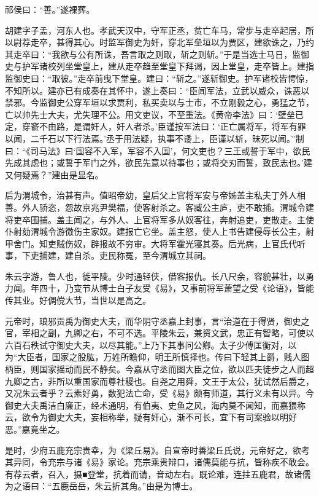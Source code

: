 \documentclass[]{article}
\begin{document}
祁侯曰：``善。''遂裸葬。

胡建字子孟，河东人也。孝武天汉中，守军正丞，贫亡车马，常步与走卒起居，所以尉荐走卒，甚得其心。时监军御史为奸，穿北军垒垣以为贾区，建欲诛之，乃约其走卒曰：``我欲与公有所诛，吾言取之则取，斩之则斩。''于是当选士马日，监御史与护军诸校列坐堂皇上，建从走卒趋至堂皇下拜谒，因上堂皇，走卒皆上。建指监御史曰：``取彼。''走卒前曳下堂皇。建曰：``斩之。''遂斩御史。护军诸校皆愕惊，不知所以。建亦已有成奏在其怀中，遂上奏曰：``臣闻军法，立武以威众，诛恶以禁邪。今监御史公穿军垣以求贾利，私买卖以与士市，不立刚毅之心，勇猛之节，亡以帅先士大夫，尤失理不公。用文吏议，不至重法。《黄帝李法》曰：`壁垒已定，穿窬不由路，是谓奸人，奸人者杀。'臣谨按军法曰：`正亡属将军，将军有罪以闻，二千石以下行法焉。'丞于用法疑，执事不诿上，臣谨以斩，昧死以闻。''制曰：``《司马法》曰`国容不入军，军容不入国'，何文吏也？三王或誓于军中，欲民先成其虑也；或誓于军门之外，欲民先意以待事也；或将交刃而誓，致民志也。'建又何疑焉？''建由是显名。

后为渭城令，治甚有声。值昭帝幼，皇后父上官将军安与帝姊盖主私夫丁外人相善。外人骄恣，怨故京兆尹樊福，使客射杀之。客臧公主庐，吏不敢捕。渭城令建将吏卒围捕。盖主闻之，与外人、上官将军多从奴客往，奔射追吏，吏散走。主使仆射劾渭城令游徼伤主家奴。建报亡它坐。盖主怒，使人上书告建侵辱长公主，射甲舍门。知吏贼伤奴，辟报故不穷审。大将军霍光寝其奏。后光病，上官氏代听事，下吏捕建，建自杀。吏民称冤，至今渭城立其祠。

朱云字游，鲁人也，徙平陵。少时通轻侠，借客报仇。长八尺余，容貌甚壮，以勇力闻。年四十，乃变节从博士白子友受《易》，又事前将军萧望之受《论语》，皆能传其业。好倜傥大节，当世以是高之。

元帝时，琅邪贡禹为御史大夫，而华阴守丞嘉上封事，言``治道在于得贤，御史之官，宰相之副，九卿之右，不可不选。平陵朱云，兼资文武，忠正有智略，可使以六百石秩试守御史大夫，以尽其能。''上乃下其事问公卿。太子少傅匡衡对，以为``大臣者，国家之股肱，万姓所瞻仰，明王所慎择也。传曰下轻其上爵，贱人图柄臣，则国家摇动而民不静矣。今嘉从守丞而图大臣之位，欲以匹夫徒步之人而超九卿之古，非所以重国家而尊社稷也。自尧之用舜，文王于太公，犹试然后爵之，又况朱云者乎？云素好勇，数犯法亡命，受《易》颇有师道，其行义未有以异。今御史大夫禹洁白廉正，经术通明，有伯夷、史鱼之风，海内莫不闻知，而嘉猥称云，欲令为御史大夫，妄相称举，疑有奸心，渐不可长，宜下有司案验以明好恶。''嘉竟坐之。

是时，少府五鹿充宗贵幸，为《梁丘易》。自宣帝时善梁丘氏说，元帝好之，欲考其异同，令充宗与诸《易》家论。充宗乘贵辩口，诸儒莫能与抗，皆称疾不敢会。有荐云者，召入，摄■登堂，抗着而请，音动左右。既论难，连拄五鹿君，故诸儒为之语曰：``五鹿岳岳，朱云折其角。''由是为博士。
\end{document}
